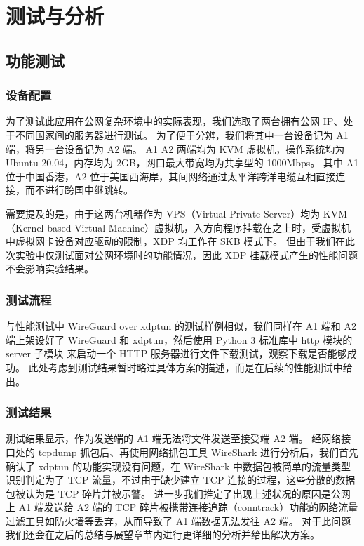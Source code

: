 

\chapter{测试与分析}

\section{功能测试}

\subsection{设备配置}

为了测试此应用在公网复杂环境中的实际表现，我们选取了两台拥有公网 IP、处于不同国家间的服务器进行测试。
为了便于分辨，我们将其中一台设备记为 A1 端，将另一台设备记为 A2 端。
A1 A2 两端均为 KVM 虚拟机，操作系统均为 Ubuntu 20.04，内存均为 2GB，网口最大带宽均为共享型的 1000Mbps。
其中 A1 位于中国香港，A2 位于美国西海岸，其间网络通过太平洋跨洋电缆互相直接连接，而不进行跨国中继跳转。

需要提及的是，由于这两台机器作为 VPS（Virtual Private Server）均为 KVM（Kernel-based Virtual Machine）虚拟机，入方向程序挂载在之上时，受虚拟机中虚拟网卡设备对应驱动的限制，XDP 均工作在 SKB 模式下。
但由于我们在此次实验中仅测试面对公网环境时的功能情况，因此 XDP 挂载模式产生的性能问题不会影响实验结果。

\subsection{测试流程}

与性能测试中 WireGuard over xdptun 的测试样例相似，我们同样在 A1 端和 A2 端上架设好了 WireGuard 和 xdptun，然后使用 Python 3 标准库中 http 模块的 server 子模块 来启动一个 HTTP 服务器进行文件下载测试，观察下载是否能够成功。
此处考虑到测试结果暂时略过具体方案的描述，而是在后续的性能测试中给出。

\subsection{测试结果}

测试结果显示，作为发送端的 A1 端无法将文件发送至接受端 A2 端。
经网络接口处的 tcpdump 抓包后、再使用网络抓包工具 WireShark 进行分析后，我们首先确认了 xdptun 的功能实现没有问题，在 WireShark 中数据包被简单的流量类型识别判定为了 TCP 流量，不过由于缺少建立 TCP 连接的过程，这些分散的数据包被认为是 TCP 碎片并被示警。
进一步我们推定了出现上述状况的原因是公网上 A1 端发送给 A2 端的 TCP 碎片被携带连接追踪（conntrack）功能的网络流量过滤工具如防火墙等丢弃，从而导致了 A1 端数据无法发往 A2 端。
对于此问题我们还会在之后的总结与展望章节内进行更详细的分析并给出解决方案。

